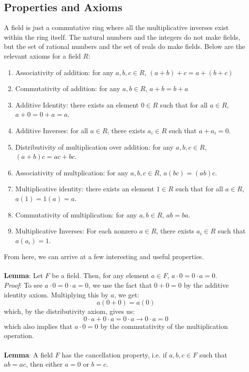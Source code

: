 \documentclass[11pt]{report}
\begin{document}
\subsection{Properties and Axioms}
A field is just a commutative ring where all the multiplicative inverses exist within the ring itself. The natural numbers and the integers do not make fields, but the set of rational numbers and the set of reals do make fields. Below are the relevant axioms for a field $R$:
\begin{enumerate}
\item Associativity of addition: for any $a,b,c \in R$, $(a+b)+c = a+(b+c)$
\item Commutativity of addition: for any $a,b \in R$, $a+b = b+a$
\item Additive Identity: there exists an element $0 \in R$ such that for all $a \in R$, $a + 0 = 0 + a = a$.
\item Additive Inverses: for all $a \in R$, there exists $a_i \in R$ such that $a + a_i = 0$.
\item Distributivity of multiplication over addition: for any $a,b,c \in R$, $(a+b)c = ac + bc$.
\item Associativity of multplication: for any $a,b,c \in R$, $a(bc)=(ab)c$.
\item Multiplicative identity: there exists an element $1 \in R$ such that for all $a \in R$, $a(1) = 1(a) = a$.
\item Commutativity of multiplication: for any $a,b \in R$, $ab = ba$.
\item Multiplicative Inverses: For each nonzero $a \in R$, there exists $a_i \in R$ such that $a(a_i) = 1$.
\end{enumerate}
From here, we can arrive at a few interesting and useful properties. \\
\\ 
\textbf{Lemma}: Let $F$ be a field. Then, for any element $a \in F$, $a \cdot 0 = 0 \cdot a = 0$. \\
\textit{Proof}: To see $a \cdot 0 = 0 \cdot a = 0$, we use the fact that $0 + 0 = 0$ by the additive identity axiom. Multiplying this by $a$, we get:
$$a(0+0) = a(0)$$
which, by the distributivity axiom, gives us:
$$0 \cdot a + 0 \cdot a = 0 \cdot a \rightarrow 0 \cdot a = 0$$
which also implies that $a \cdot 0 = 0$ by the commutativity of the multiplication operation.
\\ \\
\textbf{Lemma}: A field $F$ has the cancellation property, i.e. if $a,b,c \in F$ such that $ab = ac$, then either $a = 0$ or $b = c$. \\
\end{document}
